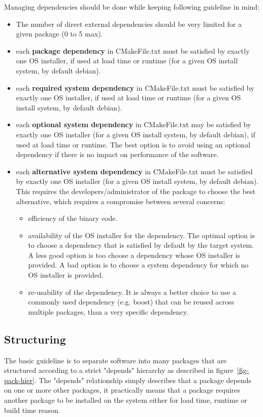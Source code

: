 \documentclass[12pt,a4paper]{article}
\begin{document}
Managing dependencies should be done while keeping following guideline in mind:
\begin{itemize}
\item The number of direct external dependencies should be very limited for a given package (0 to 5 max).
\item each \textbf{package dependency} in CMakeFile.txt must be satisfied by exactly one OS installer, if used at load time or runtime (for a given OS install system, by default debian).
\item each \textbf{required system dependency} in CMakeFile.txt must be satisfied by exactly one OS installer, if used at load time or runtime (for a given OS install system, by default debian).
\item each \textbf{optional system dependency} in CMakeFile.txt may be satisfied by exactly one OS installer (for a given OS install system, by default debian), if used at load time or runtime. The best option is to avoid using an optional dependency if there is no impact on performance of the software.
\item each \textbf{alternative system dependency} in CMakeFile.txt must be satisfied by exactly one OS installer (for a given OS install system, by default debian). This requires the developers/administrator of the package to choose the best alternative, which requires a compromise between several concerns:
\begin{itemize}
\item efficiency of the binary code. 
\item availability of the OS installer for the dependency. The optimal option is to choose a dependency that is satisfied by default by the target system. A less good option is too choose a dependency whose OS installer is provided. A bad option is to choose a system dependency for which no OS installer is provided.
\item re-usability of the dependency. It is always a better choice to use a commonly used dependency (e.g. boost) that can be reused across multiple packages, than a very specific dependency.
\end{itemize}
\end{itemize}


\subsection{Structuring}

The basic guideline is to separate software into many packages that are structured according to a strict "depends" hierarchy as described in figure~\ref{fig-pack-hier}. The "depends" relationship simply describes that a package depends on one or more other packages, it practically means that a package requires another package to be installed on the system either for load time, runtime or build time reason. 
\end{document}
